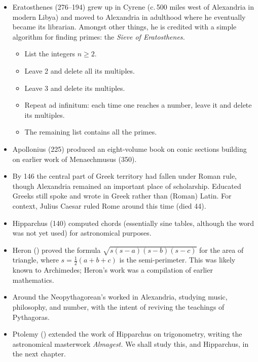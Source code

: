 \begin{itemize}
  \item Eratosthenes (276--194\BC) grew up in Cyrene (c.\,500 miles west of Alexandria in modern Libya) and moved to Alexandria in adulthood where he eventually became its librarian. Amongst other things, he is credited with a simple algorithm for finding primes: the \emph{Sieve of Eratosthenes.}
  \begin{itemize}
    \item List the integers $n\ge 2$.
    \item Leave 2 and delete all its multiples.
    \item Leave 3 and delete its multiples.
    \item Repeat ad infinitum: each time one reaches a number, leave it and delete its multiples.
    \item The remaining list contains all the primes. 
  \end{itemize}

  \item Apollonius (225\BC) produced an eight-volume book on conic sections building on earlier work of Menaechmusus (350\BC).
  
  \item By 146\BC{} the central part of Greek territory had fallen under Roman rule, though Alexandria remained an important place of scholarship. Educated Greeks still spoke and wrote in Greek rather than (Roman) Latin. For context, Julius Caesar ruled Rome around this time (died 44\BC).
  
  \item Hipparchus (140\BC) computed chords (essentially sine tables, although the word was not yet used) for astronomical purposes.
  
  \item Heron () proved the formula $\sqrt{s(s-a)(s-b)(s-c)}$ for the area of triangle, where $s=\frac 12(a+b+c)$ is the semi-perimeter. This was likely known to Archimedes; Heron's work was a compilation of earlier mathematics.
  
  \item Around  the Neopythagorean's worked in Alexandria, studying music, philosophy, and number, with the intent of reviving the teachings of Pythagoras.
  
  \item Ptolemy () extended the work of Hipparchus on trigonometry, writing the astronomical masterwork \emph{Almagest.} We shall study this, and Hipparchus, in the next chapter.
  

\end{itemize}
